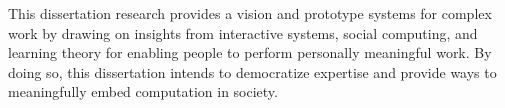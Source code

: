 %
%
%
%



This dissertation research provides a vision and prototype systems for complex work by drawing on insights from interactive systems, social computing, and learning theory for enabling people to perform personally meaningful work. By doing so, this dissertation intends to democratize expertise and provide ways to meaningfully embed computation in society. 
